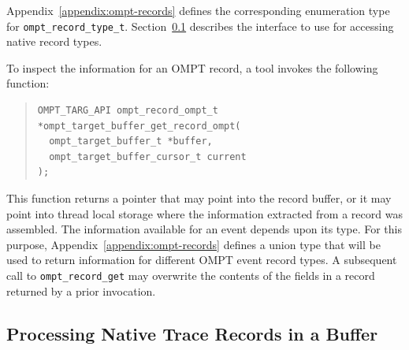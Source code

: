 \documentclass{article}
\begin{document}
Appendix~\ref{appendix:ompt-records} defines the corresponding enumeration type for \verb|ompt_record_type_t|. 
Section~\ref{sec:native-record-data} describes the interface to use for accessing native record types.
 

To inspect the information for an OMPT record, a tool invokes the following function:
\begin{quote}
\begin{verbatim}
OMPT_TARG_API ompt_record_ompt_t *ompt_target_buffer_get_record_ompt(
  ompt_target_buffer_t *buffer, 
  ompt_target_buffer_cursor_t current
);
\end{verbatim}
\end{quote}
This function returns a pointer that may point into the record buffer, or it may point into thread local storage where the information extracted from a record was assembled. The information available for an event depends upon its type. For this purpose, Appendix~\ref{appendix:ompt-records} defines a union type that will be used to return information for different OMPT event record types. A subsequent call to \verb|ompt_record_get| may overwrite the contents of the fields in a record returned by a prior invocation.

\subsection{Processing Native Trace Records in a Buffer}
\label{sec:native-record-data}
\end{document}
